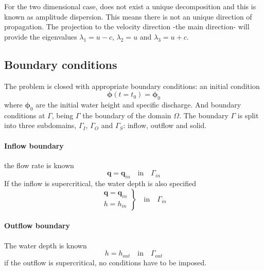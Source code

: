 For the two dimensional case, does not exist a unique decomposition and this is known as amplitude dispersion. This means there is not an unique direction of propagation. The projection to the velocity direction -the main direction- will provide the eigenvalues $\lambda_1 = u - c$, $\lambda_2 = u$ and $\lambda_3 = u + c$.






\subsection{Boundary conditions}
\label{equations_sw_bc}


The problem is closed with appropriate boundary conditions: an initial condition
\begin{equation}
\bm{\phi}(t=t_0) = \bm{\phi}_0
\end{equation}
where $\bm{\phi}_0$ are the initial water height and specific discharge. And boundary conditions at $\Gamma$, being $\Gamma$ the boundary of the domain $\Omega$. The boundary $\Gamma$ is split into three subdomains, $\Gamma_I$, $\Gamma_O$ and $\Gamma_S$: inflow, outflow and solid.
\paragraph{Inflow boundary} the flow rate is known
\begin{equation*}
    \mathbf{q} = \mathbf{q}_{in} \quad \text{in} \quad \Gamma_{in}
\end{equation*}
If the inflow is supercritical, the water depth is also specified
\begin{equation*}
    \left.\begin{matrix}
    \mathbf{q} = \mathbf{q}_{in} \\
    h = h_{in}
    \end{matrix}\right\}
    \quad \text{in} \quad \Gamma_{in}
\end{equation*}


\paragraph{Outflow boundary} The water depth is known
\begin{equation*}
    h = h_{out} \quad \text{in} \quad \Gamma_{out}
\end{equation*}
if the outflow is supercritical, no conditions have to be imposed.


